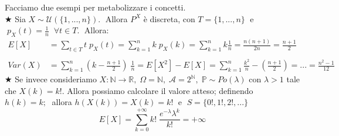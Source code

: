 \begin{esempio}
    Facciamo due esempi per metabolizzare i concetti.\\
    \(\bigstar\) Sia $X\sim \mathcal{U}(\{1, ..., n\}).\;$ Allora $P^X$ è discreta, con $T=\{1, ..., n\}\;$ e $\;p_X(t) = \frac{1}{n}\;\;\forall t \in T.\;$ Allora: 
        \begin{align*}
            E[X] &= \sum_{t \in T} t\;p_X(t) = \sum_{k = 1}^n k\;p_X(k) = \sum_{k = 1}^nk\frac{1}{n} = \frac{n(n+1)}{2n} = \frac{n+1}{2}\\
            \\
            Var(X) &= \sum_{k = 1}^n \left(k-\frac{n+1}{2}\right)\;\frac{1}{n} = E[X^2] - E[X] = \sum_{k = 1}^n\frac{k^2}{n} - \left(\frac{n+1}{2}\right)= ...=\frac{n^2-1}{12} 
        \end{align*}
    \(\bigstar\) Se invece consideriamo $X:\mathbb{N}\to \mathbb{R},\;\Omega= \mathbb{N}, \;\mathcal{A} = 2^\mathbb{N}, \; \mathbb{P}\sim Po(\lambda)$ con $\lambda > 1$ tale che $X(k) = k!$. Allora possiamo calcolare il valore atteso; definendo $h(k) = k;\;$ allora $h(X(k)) = X(k) = k!\;$ e $\;S = \{0!, 1!, 2!, ...\}$ 
    \[E[X] = \sum_{k=0}^{+\infty} k!\;\frac{e^{-\lambda}\lambda^k}{k!} = +\infty\]
\end{esempio}
